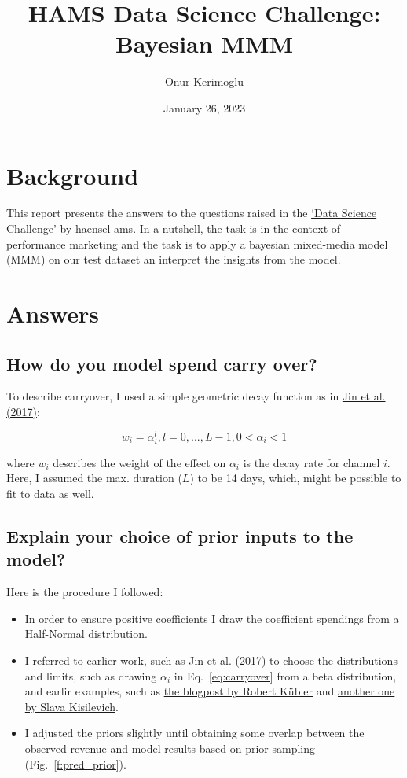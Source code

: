 \documentclass[a4paper,10pt]{scrartcl}
\title{HAMS Data Science Challenge: Bayesian MMM}
\author{Onur Kerimoglu}
\date{January 26, 2023}
\begin{document}
\maketitle

\section{Background}
This report presents the answers to the questions raised in the \href{https://github.com/haensel-ams/recruitment_challenge/tree/master/DataScience_202209}{`Data Science Challenge' by haensel-ams}. In a nutshell, the task is in the context of performance marketing and the task is to apply a bayesian mixed-media model (MMM) on our test dataset an interpret the insights from the model.

\section{Answers}

\subsection{How do you model spend carry over?}

To describe carryover, I used a simple geometric decay function as in \href{https://static.googleusercontent.com/media/research.google.com/en//pubs/archive/46001.pdf}{Jin et al. (2017)}:

\begin{equation}\label{eq:carryover}
 w_i = \alpha_i^l, l=0,...,L-1, 0<\alpha_i<1
\end{equation}

where $w_i$ describes the weight of the effect on   $\alpha_i$ is the decay rate for channel $i$. Here, I assumed the max. duration ($L$) to be 14 days, which, might be possible to fit to data as well.

\subsection {Explain your choice of prior inputs to the model?}

Here is the procedure I followed:
\begin{itemize}
 \item In order to ensure positive coefficients I draw the coefficient spendings from a Half-Normal distribution.
 \item I referred to earlier work, such as Jin et al. (2017) to choose the distributions and limits, such as drawing $\alpha_i$ in Eq.~\ref{eq:carryover} from a beta distribution, and earlir examples, such as \href{https://towardsdatascience.com/bayesian-marketing-mix-modeling-in-python-via-pymc3-7b2071f6001a}{the blogpost by Robert Kübler} and \href{https://towardsdatascience.com/modeling-marketing-mix-using-pymc3-ba18dd9e6e68}{another one by Slava Kisilevich}.
 \item I adjusted the priors slightly until obtaining some overlap between the observed revenue and model results based on prior sampling (Fig.~\ref{f:pred_prior}).
\end{itemize}
\end{document}

